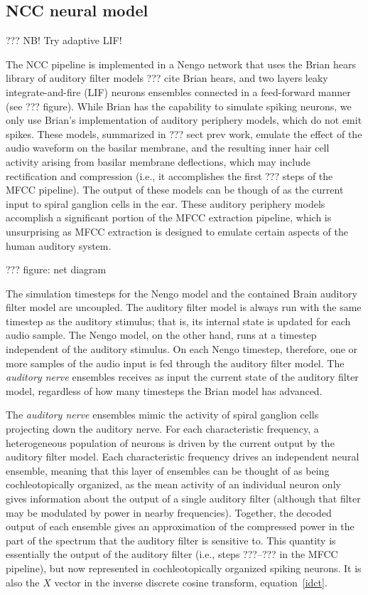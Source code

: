 \subsection{NCC neural model}

??? NB! Try adaptive LIF!

The NCC pipeline is implemented
in a Nengo network that uses
the Brian hears library
of auditory filter models
??? cite Brian hears,
and two layers
leaky integrate-and-fire (LIF) neurons ensembles
connected in a feed-forward manner
(see ??? figure).
While Brian has the capability
to simulate spiking neurons,
we only use Brian's implementation of
auditory periphery models,
which do not emit spikes.
These models,
summarized in ??? sect prev work,
emulate the effect of the
audio waveform on the basilar membrane,
and the resulting inner hair cell activity
arising from basilar membrane deflections,
which may include rectification
and compression
(i.e., it accomplishes the first
??? steps of the MFCC pipeline).
The output of these models
can be though of as
the current input
to spiral ganglion cells in the ear.
These auditory periphery models
accomplish a significant portion
of the MFCC extraction pipeline,
which is unsurprising as MFCC extraction
is designed to emulate certain aspects
of the human auditory system.

??? figure: net diagram

The simulation timesteps
for the Nengo model and the contained
Brain auditory filter model
are uncoupled.
The auditory filter model
is always run with the same timestep
as the auditory stimulus;
that is, its internal state is updated
for each audio sample.
The Nengo model, on the other hand,
runs at a timestep independent
of the auditory stimulus.
On each Nengo timestep,
therefore, one or more samples
of the audio input
is fed through the
auditory filter model.
The \textit{auditory nerve} ensembles
receives as input the current
state of the auditory filter model,
regardless of how many timesteps
the Brian model has advanced.

The \textit{auditory nerve} ensembles
mimic the activity of spiral ganglion cells
projecting down the auditory nerve.
For each characteristic frequency,
a heterogeneous population of neurons
is driven by the current output by
the auditory filter model.
Each characteristic frequency
drives an independent neural ensemble,
meaning that this layer of ensembles
can be thought of as being cochleotopically organized,
as the mean activity of an individual neuron
only gives information about the output
of a single auditory filter
(although that filter may be modulated
by power in nearby frequencies).
Together, the decoded output of
each ensemble gives an approximation of
the compressed power in the part of the spectrum
that the auditory filter is sensitive to.
This quantity is essentially
the output of the auditory filter
(i.e., steps ???--??? in the MFCC pipeline),
but now represented in
cochleotopically organized spiking neurons.
It is also the $X$ vector in
the inverse discrete cosine transform,
equation~\eqref{idct}.

